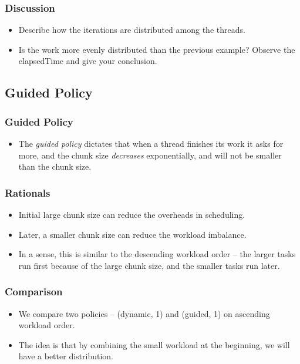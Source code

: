 \documentclass{beamer}
\begin{document}
\begin{frame}
  \frametitle{Discussion}
  \begin{itemize}
  \item Describe how the iterations are distributed among the threads.
  \item Is the work more evenly distributed than the previous example?
    Observe the elapsedTime and give your conclusion.
  \end{itemize}
\end{frame}

\subsection{Guided Policy}


\begin{frame}
  \frametitle{Guided Policy}
  \begin{itemize}
  \item The {\em guided policy} dictates that when a thread finishes
    its work it asks for more, and the chunk size {\em decreases}
    exponentially, and will not be smaller than the chunk size.
  \end{itemize}
\end{frame}

\begin{frame}
  \frametitle{Rationals}
  \begin{itemize}
  \item Initial large chunk size can reduce the overheads in scheduling.
  \item Later, a smaller chunk size can reduce the workload imbalance.
  \item In a sense, this is similar to the descending workload order -- the larger tasks run first because of the large chunk size, and the smaller tasks run later.
  \end{itemize}
\end{frame}


\begin{frame}
  \frametitle{Comparison}
  \begin{itemize}
  \item We compare two policies -- (dynamic, 1) and (guided, 1) on
    ascending workload order.
  \item The idea is that by combining the small workload at the
    beginning, we will have a better distribution.
  \end{itemize}
\end{frame}
\end{document}
